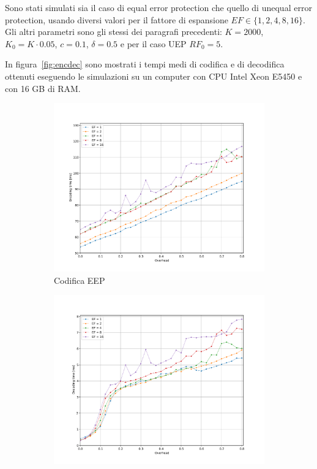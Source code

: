 \documentclass[italian, a4paper, 12pt]{article}
\begin{document}
Sono stati simulati sia il caso di equal error protection che quello
di unequal error protection, usando diversi valori per il fattore di
espansione $EF \in \{ 1,2,4,8,16 \}$.
%
Gli altri parametri sono gli stessi dei paragrafi precedenti: $K =
2000$, $K_0 = K \cdot 0.05$, $c=0.1$, $\delta=0.5$ e per il caso UEP
$RF_0 = 5$.

In figura~\ref{fig:encdec} sono mostrati i tempi medi di codifica e di
decodifica ottenuti eseguendo le simulazioni su un computer con CPU
Intel Xeon E5450 e con 16 GB di RAM.
%
\begin{figure}[H]
  \centering
  \begin{subfigure}{0.5\textwidth}
    \centering
    \includegraphics[width=\textwidth]{plot_enc_time_eep}
    \caption{Codifica EEP}
    \label{fig:enctime_eep}
  \end{subfigure}%
  \begin{subfigure}{0.5\textwidth}
    \centering
    \includegraphics[width=\textwidth]{plot_dec_time_eep}

\end{subfigure}
\end{figure}
\end{document}
